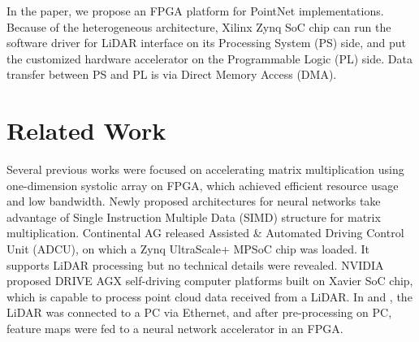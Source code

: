 \documentclass[conference]{IEEEtran}
\begin{document}
In the paper, we propose an FPGA platform for PointNet implementations. Because of the heterogeneous architecture, Xilinx Zynq SoC chip can run the software driver for LiDAR interface on its Processing System (PS) side, and put the customized hardware accelerator on the Programmable Logic (PL) side. Data transfer between PS and PL is via Direct Memory Access (DMA).

\section{Related Work}
Several previous works \cite{shen2018towards}\cite{wu2010high} were focused on accelerating matrix multiplication using one-dimension systolic array on FPGA, which achieved efficient resource usage and low bandwidth. Newly proposed architectures \cite{zhang2015optimizing}\cite{qiu2016going} for neural networks take advantage of Single Instruction Multiple Data (SIMD) structure for matrix multiplication.
Continental AG released Assisted \& Automated Driving Control Unit (ADCU)\cite{ADCU2018}, on which a Zynq UltraScale+ MPSoC chip was loaded. It supports LiDAR processing but no technical details were revealed. NVIDIA proposed DRIVE AGX self-driving computer platforms built on Xavier SoC chip, which is capable to process point cloud data received from a LiDAR. In \cite{lyu2018real} and \cite{lyu2018chipnet}, the LiDAR was connected to a PC via Ethernet, and after pre-processing on PC, feature maps were fed to a neural network accelerator in an FPGA.

\end{document}
